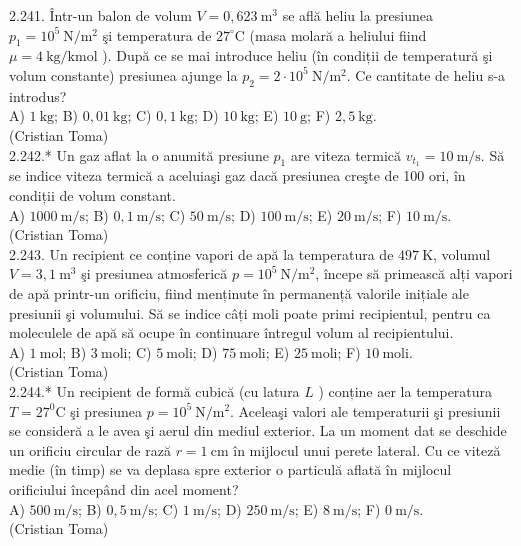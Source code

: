 2.241. Într-un balon de volum $V=0,623 \mathrm{~m}^{3}$ se află heliu la presiunea $p_{1}=10^{5} \mathrm{~N} / \mathrm{m}^{2}$ şi temperatura de $27^{\circ} \mathrm{C}$ (masa molară a heliului fiind $\mu=4 \mathrm{~kg} / \mathrm{kmol}$ ). După ce se mai introduce heliu (în condiții de temperatură şi volum constante) presiunea ajunge la $p_{2}=2 \cdot 10^{5} \mathrm{~N} / \mathrm{m}^{2}$. Ce cantitate de heliu s-a introdus?\\ A) $1 \mathrm{~kg}$; B) $0,01 \mathrm{~kg}$; C) $0,1 \mathrm{~kg}$; D) $10 \mathrm{~kg}$; E) $10 \mathrm{~g}$; F) $2,5 \mathrm{~kg}$.\\ (Cristian Toma)\\

2.242.* Un gaz aflat la o anumită presiune $p_{1}$ are viteza termică $v_{t_{1}}=10 \mathrm{~m} / \mathrm{s}$. Să se indice viteza termică a aceluiaşi gaz dacă presiunea creşte de 100 ori, în condiții de volum constant.\\ A) $1000 \mathrm{~m} / \mathrm{s}$; B) $0,1 \mathrm{~m} / \mathrm{s}$; C) $50 \mathrm{~m} / \mathrm{s}$; D) $100 \mathrm{~m} / \mathrm{s}$; E) $20 \mathrm{~m} / \mathrm{s}$; F) $10 \mathrm{~m} / \mathrm{s}$.\\ (Cristian Toma)\\

2.243. Un recipient ce conține vapori de apă la temperatura de $497 \mathrm{~K}$, volumul $V=3,1 \mathrm{~m}^{3}$ şi presiunea atmosferică $p=10^{5} \mathrm{~N} / \mathrm{m}^{2}$, începe să primească alți vapori de apă printr-un orificiu, fiind menținute în permanență valorile inițiale ale presiunii şi volumului. Să se indice câți moli poate primi recipientul, pentru ca moleculele de apă să ocupe în continuare întregul volum al recipientului.\\ A) $1 \mathrm{~mol}$; B) $3 \mathrm{~moli}$; C) $5 \mathrm{~moli}$; D) $75 \mathrm{~moli}$; E) $25 \mathrm{~moli}$; F) $10 \mathrm{~moli}$.\\ (Cristian Toma)\\

2.244.* Un recipient de formă cubică (cu latura $L$ ) conține aer la temperatura $T=27^{0} \mathrm{C}$ şi presiunea $p=10^{5} \mathrm{~N} / \mathrm{m}^{2}$. Aceleaşi valori ale temperaturii şi presiunii se consideră a le avea şi aerul din mediul exterior. La un moment dat se deschide un orificiu circular de rază $r=1 \mathrm{~cm}$ în mijlocul unui perete lateral. Cu ce viteză medie (în timp) se va deplasa spre exterior o particulă aflată în mijlocul orificiului începând din acel moment?\\ A) $500 \mathrm{~m} / \mathrm{s}$; B) $0,5 \mathrm{~m} / \mathrm{s}$; C) $1 \mathrm{~m} / \mathrm{s}$; D) $250 \mathrm{~m} / \mathrm{s}$; E) $8 \mathrm{~m} / \mathrm{s}$; F) $0 \mathrm{~m} / \mathrm{s}$.\\ (Cristian Toma)\\

